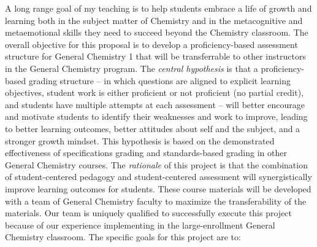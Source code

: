 \documentclass[10pt,letterpaper]{article}
\begin{document}
A long range goal of my teaching is to help students embrace a life of growth and learning both in the subject matter of Chemistry and in the metacognitive and metaemotional skills they need to succeed beyond the Chemistry classroom.
%
The overall objective for this proposal is to develop a proficiency-based assessment structure for General Chemistry 1 that will be transferrable to other instructors in the General Chemistry program. 
The \textit{central hypothesis} is that a proficiency-based grading structure -- in which questions are aligned to explicit learning objectives, student work is either proficient or not proficient (no partial credit), and students have multiple attempts at each assessment -- will better encourage and motivate students to identify their weaknesses and work to improve, leading to
better learning outcomes, better attitudes about self and the subject, and a stronger growth mindset.
%
This hypothesis is based on the demonstrated effectiveness of specifications grading and standards-based grading in other General Chemistry courses.\cite{toledo2016,toledo2017,Boesdorfer2018,Martin2019}
The \textit{rationale} of this project is that the combination of student-centered pedagogy  and student-centered assessment will synergistically improve learning outcomes for students.  These course materials will be developed with a team of General Chemistry faculty to maximize the transferability of the materials. 
Our team is uniquely qualified to successfully execute this project because of our experience implementing \pogil in the large-enrollment General Chemistry classroom. The specific goals for this project are to:
\end{document}
